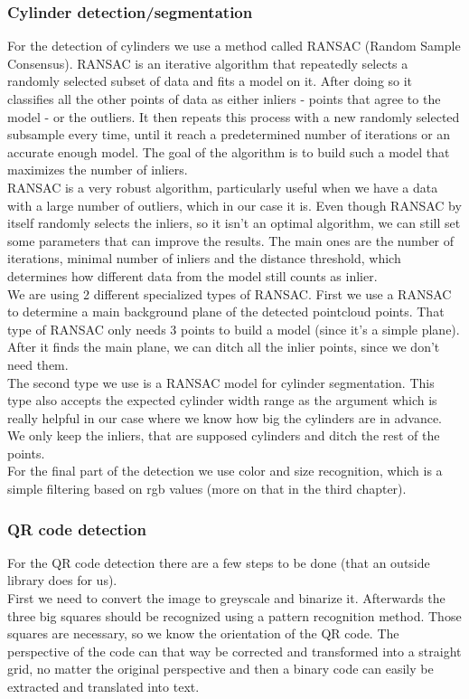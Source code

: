\documentclass[a4paper,
  twoside, %
  headlines=2.1 %
  ]{scrartcl}
\begin{document}
\subsubsection{Cylinder detection/segmentation}
For the detection of cylinders we use a method called RANSAC (Random Sample Consensus). RANSAC is an iterative algorithm that repeatedly selects a randomly selected subset of data and fits a model on it. After doing so it classifies all the other points of data as either inliers - points that agree to the model - or the outliers. It then repeats this process with a new randomly selected subsample every time, until it reach a predetermined number of iterations or an accurate enough model. The goal of the algorithm is to build such a model that maximizes the number of inliers.\\
RANSAC is a very robust algorithm, particularly useful when we have a data with a large number of outliers, which in our case it is. Even though RANSAC by itself randomly selects the inliers, so it isn't an optimal algorithm, we can still set some parameters that can improve the results. The main ones are the number of iterations, minimal number of inliers and the distance threshold, which determines how different data from the model still counts as inlier.\\
We are using 2 different specialized types of RANSAC. First we use a RANSAC to determine a main background plane of the detected pointcloud points. That type of RANSAC only needs 3 points to build a model (since it's a simple plane). After it finds the main plane, we can ditch all the inlier points, since we don't need them.\\
The second type we use is a RANSAC model for cylinder segmentation. This type also accepts the expected cylinder width range as the argument which is really helpful in our case where we know how big the cylinders are in advance. We only keep the inliers, that are supposed cylinders and ditch the rest of the points.\\
For the final part of the detection we use color and size recognition, which is a simple filtering based on rgb values (more on that in the third chapter).

\subsubsection{QR code detection}
For the QR code detection there are a few steps to be done (that an outside library does for us).\\
First we need to convert the image to greyscale and binarize it. Afterwards the three big squares should be recognized using a pattern recognition method. Those squares are necessary, so we know the orientation of the QR code. The perspective of the code can that way be corrected and transformed into a straight grid, no matter the original perspective and then a binary code can easily be extracted and translated into text.
\end{document}
